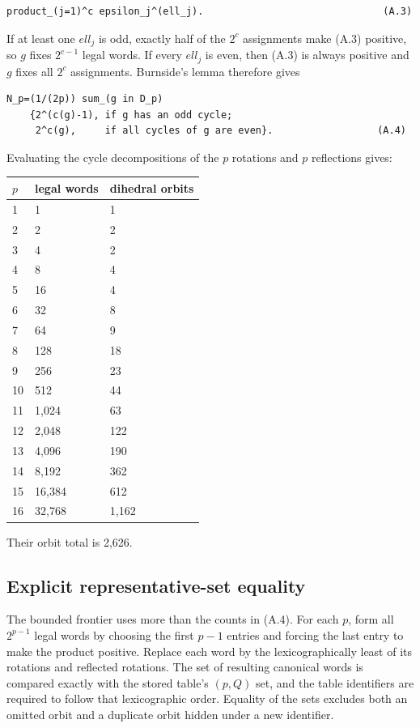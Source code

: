 \begin{lstlisting}[language={}]
product_(j=1)^c epsilon_j^(ell_j).                               (A.3)
\end{lstlisting}

If at least one \(ell_j\) is odd, exactly half of the \(2^c\) assignments make
(A.3) positive, so \(g\) fixes \(2^{c-1}\) legal words. If every \(ell_j\) is even,
then (A.3) is always positive and \(g\) fixes all \(2^c\) assignments. Burnside's
lemma therefore gives

\begin{lstlisting}[language={}]
N_p=(1/(2p)) sum_(g in D_p)
    {2^(c(g)-1), if g has an odd cycle;
     2^c(g),     if all cycles of g are even}.                  (A.4)
\end{lstlisting}

Evaluating the cycle decompositions of the \(p\) rotations and \(p\) reflections
gives:

\begin{center}
\begin{tabular}{lll}
\toprule
\(p\) & legal words & dihedral orbits \\
\midrule
1 & 1 & 1 \\
2 & 2 & 2 \\
3 & 4 & 2 \\
4 & 8 & 4 \\
5 & 16 & 4 \\
6 & 32 & 8 \\
7 & 64 & 9 \\
8 & 128 & 18 \\
9 & 256 & 23 \\
10 & 512 & 44 \\
11 & 1,024 & 63 \\
12 & 2,048 & 122 \\
13 & 4,096 & 190 \\
14 & 8,192 & 362 \\
15 & 16,384 & 612 \\
16 & 32,768 & 1,162 \\
\bottomrule
\end{tabular}%
\end{center}

Their orbit total is 2,626.

\subsection{Explicit representative-set equality}

The bounded frontier uses more than the counts in (A.4). For each \(p\), form
all \(2^{p-1}\) legal words by choosing the first \(p-1\) entries and forcing the
last entry to make the product positive. Replace each word by the
lexicographically least of its rotations and reflected rotations. The set of
resulting canonical words is compared exactly with the stored table's
\((p,Q)\) set, and the table identifiers are required to follow that
lexicographic order. Equality of the sets excludes both an omitted orbit and a
duplicate orbit hidden under a new identifier.

